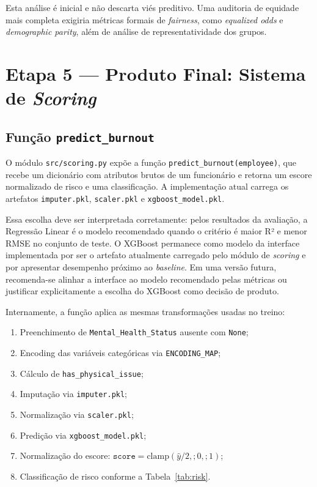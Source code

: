 \documentclass[conference]{IEEEtran}
\begin{document}
Esta análise é inicial e não descarta viés preditivo. Uma auditoria de
equidade mais completa exigiria métricas formais de \textit{fairness}, como
\textit{equalized odds} e \textit{demographic parity}, além de análise de
representatividade dos grupos.

\section{Etapa 5 — Produto Final: Sistema de \textit{Scoring}}
\label{sec:scoring_sec}

\subsection{Função \texttt{predict_burnout}}

O módulo \texttt{src/scoring.py} expõe a função
\texttt{predict_burnout(employee)}, que recebe um dicionário com atributos
brutos de um funcionário e retorna um escore normalizado de risco e uma
classificação. A implementação atual carrega os artefatos
\texttt{imputer.pkl}, \texttt{scaler.pkl} e \texttt{xgboost_model.pkl}.

Essa escolha deve ser interpretada corretamente: pelos resultados da
avaliação, a Regressão Linear é o modelo recomendado quando o critério é
maior R² e menor RMSE no conjunto de teste. O XGBoost permanece como modelo
da interface implementada por ser o artefato atualmente carregado pelo
módulo de \textit{scoring} e por apresentar desempenho próximo ao
\textit{baseline}. Em uma versão futura, recomenda-se alinhar a interface
ao modelo recomendado pelas métricas ou justificar explicitamente a escolha
do XGBoost como decisão de produto.

Internamente, a função aplica as mesmas transformações usadas no treino:

\begin{enumerate}
\item Preenchimento de \texttt{Mental_Health_Status} ausente com \texttt{None};
\item Encoding das variáveis categóricas via \texttt{ENCODING_MAP};
\item Cálculo de \texttt{has_physical_issue};
\item Imputação via \texttt{imputer.pkl};
\item Normalização via \texttt{scaler.pkl};
\item Predição via \texttt{xgboost_model.pkl};
\item Normalização do escore:
$\texttt{score} = \text{clamp}(\hat{y}/2,;0,;1)$;
\item Classificação de risco conforme a Tabela~\ref{tab:risk}.
\end{enumerate}
\end{document}
